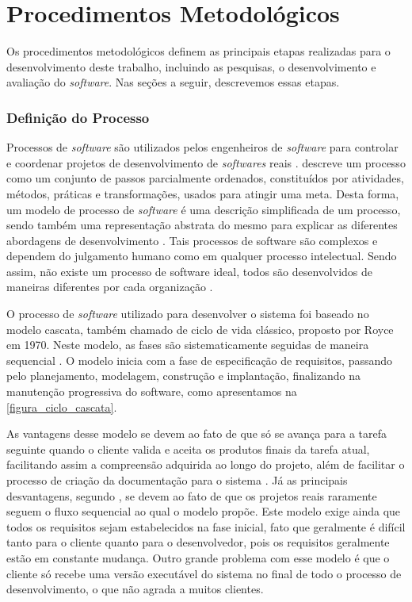 \chapter{Procedimentos Metodológicos}
\label{chap:procedimentos-metodologicos}

Os procedimentos metodológicos definem as principais etapas realizadas para o desenvolvimento deste trabalho, incluindo as pesquisas, o desenvolvimento e avaliação do \textit{software}. Nas seções a 
seguir, descrevemos essas etapas.

\subsection{Definição do Processo}

Processos de \textit{software} são utilizados pelos engenheiros de \textit{software} para controlar e coordenar projetos de desenvolvimento de \textit{softwares} reais \cite{talma2006desenvolvimento}. 
 descreve um processo como um conjunto de passos parcialmente  ordenados, constituídos por atividades, métodos, práticas e transformações, usados para atingir uma meta. 
Desta forma, um modelo de processo de \textit{software} é uma descrição simplificada de um processo, sendo também uma representação abstrata do mesmo para explicar as diferentes abordagens de 
desenvolvimento \cite{sommerville2003engenharia}. Tais processos de software são complexos e dependem do julgamento humano como em qualquer processo intelectual. Sendo assim, não existe um processo 
de software ideal, todos são desenvolvidos de maneiras 
diferentes por cada organização \cite{sommerville2003engenharia}.

O processo de \textit{software} utilizado para desenvolver o sistema foi baseado no modelo cascata, também chamado de ciclo de vida clássico, proposto por Royce em 1970. Neste modelo, as fases são 
sistematicamente seguidas de maneira sequencial \cite{pressman2006engenharia}. O modelo inicia com a fase de especificação de requisitos, passando pelo planejamento, modelagem, construção e 
implantação, finalizando na manutenção progressiva do software, como apresentamos na \autoref{figura_ciclo_cascata}.

As vantagens desse modelo se devem ao fato de que só se avança para a tarefa seguinte quando o cliente valida e aceita os produtos finais da tarefa atual, facilitando assim a compreensão adquirida ao 
longo do projeto, além de facilitar o processo de criação da documentação para o sistema \cite{pressman2006engenharia}. Já as principais desvantagens, segundo , se 
devem ao fato de que os projetos reais raramente seguem o fluxo sequencial ao qual o modelo propõe. Este modelo exige ainda que todos os requisitos sejam estabelecidos na fase 
inicial, fato que geralmente é difícil tanto para o cliente quanto para o desenvolvedor, pois os requisitos geralmente est\~ao em constante mudan\c{c}a. Outro grande problema com esse modelo é que o 
cliente só recebe uma versão executável do sistema no final de todo o processo de desenvolvimento, o que não agrada a muitos clientes.

